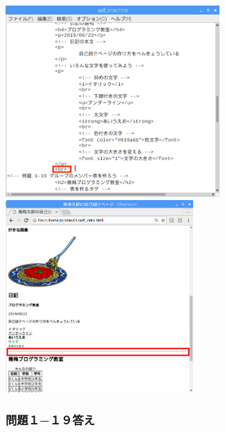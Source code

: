 \documentclass[a4paper,12pt]{jarticle}
\begin{document}
\centering
\includegraphics[width=8.186cm,height=7.304cm]{textbook-img237.png}
\includegraphics[width=7.163cm,height=7.373cm]{textbook-img238.png}
\flushleft

\bigskip


\bigskip

\clearpage\subsubsection{\bfseries
  問題１−１９答え}



\centering
{}
\flushleft

\bigskip

\centering
{}
\flushleft
\end{document}
